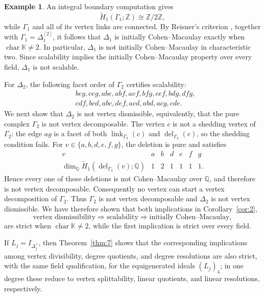 \documentclass[11pt]{amsart}
\newcommand{\K}{\mathbb K}
\DeclareMathOperator{\link}{link}
\DeclareMathOperator{\del}{del}
\theoremstyle{definition}
\newtheorem{example}[theorem]{Example}
\begin{document}
\begin{example}
		An integral boundary computation gives
		\[
		\widetilde H_1(\Gamma_1;\mathbb Z)
		\cong \mathbb Z/2\mathbb Z,
		\]
		while $\Gamma_1$ and all of its vertex links are connected. By Reisner's criterion \cite{Reisner1976}, together with $\Gamma_1=\Delta_1^{[2]}$, it follows that $\Delta_1$ is initially Cohen--Macaulay exactly when $\operatorname{char}\K\ne2$. In particular, $\Delta_1$ is not initially Cohen--Macaulay in characteristic two. Since scalability implies the initially Cohen--Macaulay property over every field, $\Delta_1$ is not scalable.
		
		For $\Delta_2$, the following facet order of $\Gamma_2$ certifies scalability:
		\[
		\begin{aligned}
			&beg,ceg,abe,abf,aef,bfg,cef,bdg,dfg,\\
			&cdf,bcd,abc,def,acd,abd,acg,cde.
		\end{aligned}
		\]
		We next show that $\Delta_2$ is not vertex dismissible, equivalently, that the pure complex $\Gamma_2$ is not vertex decomposable. The vertex $c$ is not a shedding vertex of $\Gamma_2$: the edge $ag$ is a facet of both $\link_{\Gamma_2}(c)$ and $\del_{\Gamma_2}(c)$, so the shedding condition fails. For $v\in\{a,b,d,e,f,g\}$, the deletion is pure and satisfies
		\[
		\begin{array}{c|cccccc}
			v&a&b&d&e&f&g\\ \hline
			\dim_{\mathbb Q}\widetilde H_1(\del_{\Gamma_2}(v);\mathbb Q)
			&1&2&1&1&1&1.
		\end{array}
		\]
		Hence every one of these deletions is not Cohen--Macaulay over $\mathbb Q$, and therefore is not vertex decomposable. Consequently no vertex can start a vertex decomposition of $\Gamma_2$. Thus $\Gamma_2$ is not vertex decomposable and $\Delta_2$ is not vertex dismissible. We have therefore shown that both implications in Corollary~\ref{cor:2},
		\[
		\text{vertex dismissibility}
		\Longrightarrow
		\text{scalability}
		\Longrightarrow
		\text{initially Cohen--Macaulay},
		\]
		are strict when $\operatorname{char}\K\ne2$, while the first implication is strict over every field.
		
		If $L_j=I_{\Delta_j^{\vee}}$, then Theorem~\ref{thm:7} shows that the corresponding implications among vertex divisibility, degree quotients, and degree resolutions are also strict, with the same field qualification, for the equigenerated ideals $(L_j)_4$; in one degree these reduce to vertex splittability, linear quotients, and linear resolutions, respectively.
	\end{example}
	
\end{document}
